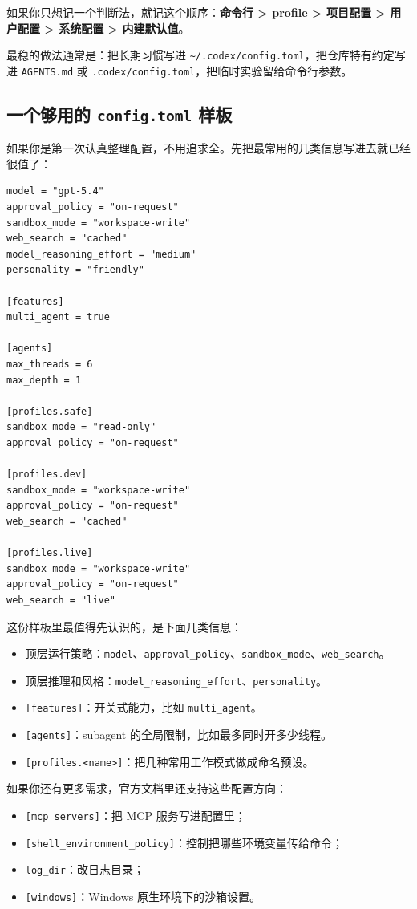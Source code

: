\documentclass[UTF8,a4paper,12pt]{ctexart}
\begin{document}
如果你只想记一个判断法，就记这个顺序：\textbf{命令行 > profile > 项目配置 > 用户配置 > 系统配置 > 内建默认值}。

\begin{tipbox}
最稳的做法通常是：把长期习惯写进 \texttt{\textasciitilde/.codex/config.toml}，把仓库特有约定写进 \texttt{AGENTS.md} 或 \texttt{.codex/config.toml}，把临时实验留给命令行参数。
\end{tipbox}

\subsection{一个够用的 \texttt{config.toml} 样板}

如果你是第一次认真整理配置，不用追求全。先把最常用的几类信息写进去就已经很值了：

\begin{lstlisting}[style=cli]
model = "gpt-5.4"
approval_policy = "on-request"
sandbox_mode = "workspace-write"
web_search = "cached"
model_reasoning_effort = "medium"
personality = "friendly"

[features]
multi_agent = true

[agents]
max_threads = 6
max_depth = 1

[profiles.safe]
sandbox_mode = "read-only"
approval_policy = "on-request"

[profiles.dev]
sandbox_mode = "workspace-write"
approval_policy = "on-request"
web_search = "cached"

[profiles.live]
sandbox_mode = "workspace-write"
approval_policy = "on-request"
web_search = "live"
\end{lstlisting}

这份样板里最值得先认识的，是下面几类信息：
\begin{itemize}
  \item 顶层运行策略：\texttt{model}、\texttt{approval\_policy}、\texttt{sandbox\_mode}、\texttt{web\_search}。
  \item 顶层推理和风格：\texttt{model\_reasoning\_effort}、\texttt{personality}。
  \item \texttt{[features]}：开关式能力，比如 \texttt{multi\_agent}。
  \item \texttt{[agents]}：subagent 的全局限制，比如最多同时开多少线程。
  \item \texttt{[profiles.<name>]}：把几种常用工作模式做成命名预设。
\end{itemize}

如果你还有更多需求，官方文档里还支持这些配置方向：
\begin{itemize}
  \item \texttt{[mcp\_servers]}：把 MCP 服务写进配置里；
  \item \texttt{[shell\_environment\_policy]}：控制把哪些环境变量传给命令；
  \item \texttt{log\_dir}：改日志目录；
  \item \texttt{[windows]}：Windows 原生环境下的沙箱设置。
\end{itemize}
\end{document}
